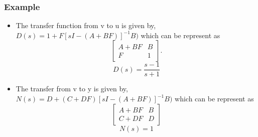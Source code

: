 \documentclass{beamer}
\begin{document}
\begin{frame}
\frametitle{Example}
\begin{small}

        \begin{itemize}
\item The transfer function from v to u is given by,\\
 $D(s)=1+F[sI-(A+BF)]^{-1}B)$ which can be represent as
\[ \left[ \begin{array}{c|c}
A+BF& B \\
\hline
F & 1 \end{array} \right].\]
\begin{equation}
D(s)=\frac{s-1}{s+1}
\end{equation}
\item The transfer from v to y is given by,\\
 $N(s)=D+(C+DF)[sI-(A+BF)]^{-1}B)$  which can be represent as 
\[ \left[ \begin{array}{c|c}
A+BF& B \\
\hline
C+DF & D \end{array} \right]\]
\begin{equation}
N(s)=1
\end{equation}
\end{itemize}
\end{small}

\end{frame}











\end{document}
